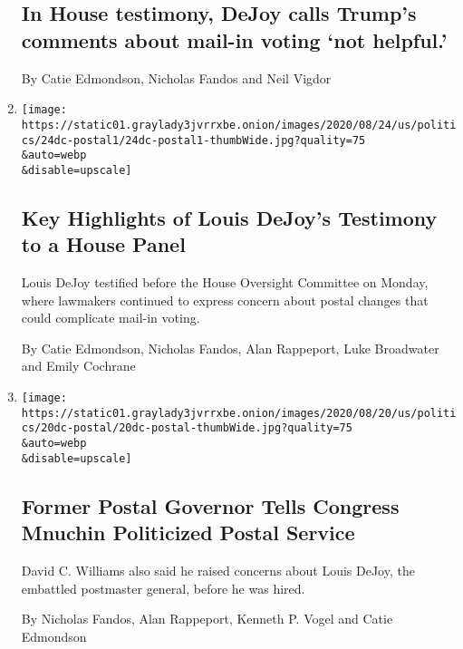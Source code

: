 \begin{enumerate}
  \hypertarget{in-house-testimony-dejoy-calls-trumps-comments-about-mail-in-voting-not-helpful}{%
  \subsection{In House testimony, DeJoy calls Trump's comments about
  mail-in voting `not
  helpful.'}\label{in-house-testimony-dejoy-calls-trumps-comments-about-mail-in-voting-not-helpful}}

  By Catie Edmondson, Nicholas Fandos and Neil Vigdor
\item
  \href{/2020/08/24/us/politics/postal-service-dejoy-testimony.html}{}

  \texttt{[image: https://static01.graylady3jvrrxbe.onion/images/2020/08/24/us/politics/24dc-postal1/24dc-postal1-thumbWide.jpg?quality=75\\\&auto=webp\\\&disable=upscale]}

  \hypertarget{key-highlights-of-louis-dejoys-testimony-to-a-house-panel}{%
  \subsection{Key Highlights of Louis DeJoy's Testimony to a House
  Panel}\label{key-highlights-of-louis-dejoys-testimony-to-a-house-panel}}

  Louis DeJoy testified before the House Oversight Committee on Monday,
  where lawmakers continued to express concern about postal changes that
  could complicate mail-in voting.

  By Catie Edmondson, Nicholas Fandos, Alan Rappeport, Luke Broadwater
  and Emily Cochrane
\item
  \href{/2020/08/20/us/politics/former-postal-governor-tells-congress-mnuchin-politicized-postal-service.html}{}

  \texttt{[image: https://static01.graylady3jvrrxbe.onion/images/2020/08/20/us/politics/20dc-postal/20dc-postal-thumbWide.jpg?quality=75\\\&auto=webp\\\&disable=upscale]}

  \hypertarget{former-postal-governor-tells-congress-mnuchin-politicized-postal-service}{%
  \subsection{Former Postal Governor Tells Congress Mnuchin Politicized
  Postal
  Service}\label{former-postal-governor-tells-congress-mnuchin-politicized-postal-service}}

  David C. Williams also said he raised concerns about Louis DeJoy, the
  embattled postmaster general, before he was hired.

  By Nicholas Fandos, Alan Rappeport, Kenneth P. Vogel and Catie
  Edmondson
\end{enumerate}

